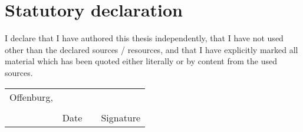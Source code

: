 \section*{Statutory declaration}

\foreignlanguage{american}{
I declare that I have authored this thesis independently, that I have not used other than the declared
sources / resources, and that I have explicitly marked all material which has been quoted either literally or by content from the used sources. }


\newcommand{\mysignatureblock}[3]{%
  \begin{tabular}{llp{2em}l} 
  #1 & \hspace{4cm}        & & \hspace{4cm} \\\cline{2-2}\cline{4-4}
     &                     & & \\[-3mm]
     & {\footnotesize #2}  & & {\footnotesize #3}
  \end{tabular}
}

\mysignatureblock{Offenburg,}{Date}{Signature}


